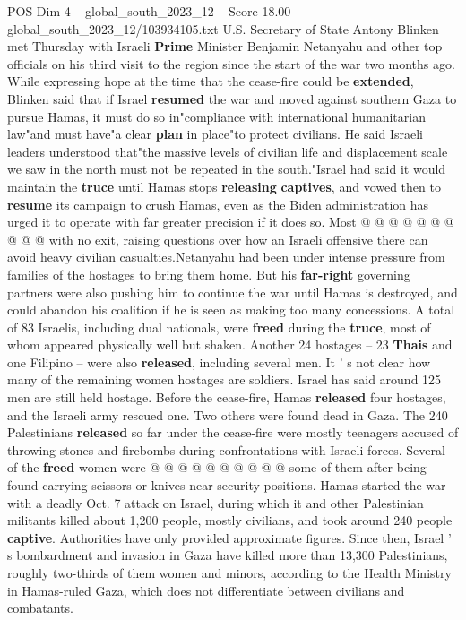 \begin{textsample}{POS Dim 4 – global\_south\_2023\_12 – Score 18.00 – global\_south\_2023\_12/103934105.txt}
U.S.
Secretary of State Antony Blinken met Thursday with Israeli \textbf{Prime} Minister Benjamin Netanyahu and other top officials on his third visit to the region since the start of the war two months ago.
While expressing hope at the time that the cease-fire could be \textbf{extended}, Blinken said that if Israel \textbf{resumed} the war and moved against southern Gaza to pursue Hamas, it must do so in"compliance with international humanitarian law"and must have"a clear \textbf{plan} in place"to protect civilians.
He said Israeli leaders understood that"the massive levels of civilian life and displacement scale we saw in the north must not be repeated in the south."Israel had said it would maintain the \textbf{truce} until Hamas stops \textbf{releasing} \textbf{captives}, and vowed then to \textbf{resume} its campaign to crush Hamas, even as the Biden administration has urged it to operate with far greater precision if it does so.
Most @ @ @ @ @ @ @ @ @ @ with no exit, raising questions over how an Israeli offensive there can avoid heavy civilian casualties.Netanyahu had been under intense pressure from families of the hostages to bring them home.
But his \textbf{far-right} governing partners were also pushing him to continue the war until Hamas is destroyed, and could abandon his coalition if he is seen as making too many concessions.
A total of 83 Israelis, including dual nationals, were \textbf{freed} during the \textbf{truce}, most of whom appeared physically well but shaken.
Another 24 hostages -- 23 \textbf{Thais} and one Filipino -- were also \textbf{released}, including several men.
It ' s not clear how many of the remaining women hostages are soldiers.
Israel has said around 125 men are still held hostage.
Before the cease-fire, Hamas \textbf{released} four hostages, and the Israeli army rescued one.
Two others were found dead in Gaza.
The 240 Palestinians \textbf{released} so far under the cease-fire were mostly teenagers accused of throwing stones and firebombs during confrontations with Israeli forces.
Several of the \textbf{freed} women were @ @ @ @ @ @ @ @ @ @ some of them after being found carrying scissors or knives near security positions.
Hamas started the war with a deadly Oct. 7 attack on Israel, during which it and other Palestinian militants killed about 1,200 people, mostly civilians, and took around 240 people \textbf{captive}.
Authorities have only provided approximate figures.
Since then, Israel ' s bombardment and invasion in Gaza have killed more than 13,300 Palestinians, roughly two-thirds of them women and minors, according to the Health Ministry in Hamas-ruled Gaza, which does not differentiate between civilians and combatants.

\end{textsample}
